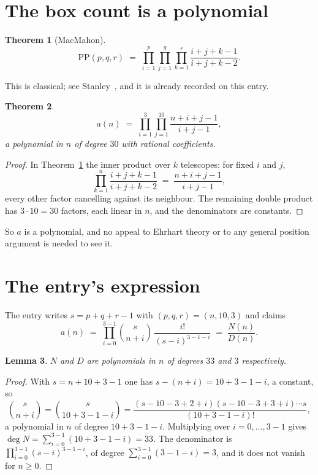\documentclass[11pt,a4paper]{article}
\theoremstyle{plain}
\newtheorem{theorem}{Theorem}
\newtheorem{lemma}[theorem]{Lemma}
\theoremstyle{definition}
\begin{document}
\section{The box count is a polynomial}

\begin{theorem}[MacMahon]\label{thm:mm}
\[
\mathrm{PP}(p,q,r)\;=\;\prod_{i=1}^{p}\prod_{j=1}^{q}\prod_{k=1}^{r}
\frac{i+j+k-1}{i+j+k-2} .
\]
\end{theorem}

This is classical; see Stanley~\cite{stanley}, and it is already recorded on this entry.

\begin{theorem}\label{thm:poly}
\[
a(n)\;=\;\prod_{i=1}^{3}\prod_{j=1}^{10}\frac{n+i+j-1}{i+j-1},
\]
a polynomial in $n$ of degree $30$ with rational coefficients.
\end{theorem}

\begin{proof}
In Theorem~\ref{thm:mm} the inner product over $k$ telescopes: for fixed $i$ and $j$,
\[
\prod_{k=1}^{n}\frac{i+j+k-1}{i+j+k-2}\;=\;\frac{n+i+j-1}{i+j-1} ,
\]
every other factor cancelling against its neighbour. The remaining double product has
$3\cdot10=30$ factors, each linear in $n$, and the denominators are constants.
\end{proof}

So $a$ is a polynomial, and no appeal to Ehrhart theory or to any general position argument is
needed to see it.

\section{The entry's expression}

The entry writes $s=p+q+r-1$ with $(p,q,r)=(n,10,3)$ and claims
\[
a(n)\;=\;\prod_{i=0}^{3-1}\binom{s}{n+i}\,\frac{i!}{(s-i)^{3-1-i}}\;=\;
\frac{N(n)}{D(n)} .
\]

\begin{lemma}\label{lem:deg}
$N$ and $D$ are polynomials in $n$ of degrees $33$ and $3$ respectively.
\end{lemma}

\begin{proof}
With $s=n+10+3-1$ one has $s-(n+i)=10+3-1-i$, a constant, so
\[
\binom{s}{n+i}=\binom{s}{10+3-1-i}
=\frac{(s-10-3+2+i)(s-10-3+3+i)\cdots s}{(10+3-1-i)!},
\]
a polynomial in $n$ of degree $10+3-1-i$. Multiplying over $i=0,\dots,3-1$ gives
$\deg N=\sum_{i=0}^{3-1}(10+3-1-i)=33$. The denominator is
$\prod_{i=0}^{3-1}(s-i)^{3-1-i}$, of degree
$\sum_{i=0}^{3-1}(3-1-i)=3$, and it does not vanish for $n\ge0$.
\end{proof}
\end{document}

